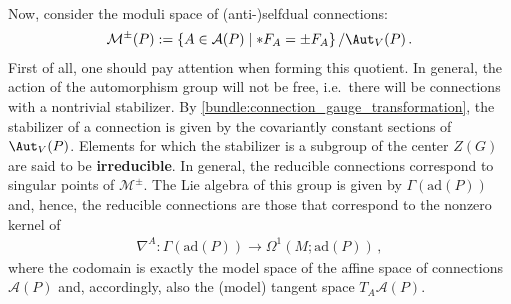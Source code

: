     Now, consider the moduli space of (anti-)selfdual connections:
    \begin{gather}
        \mathcal{M}^\pm(P) := \{A\in\mathcal{A}(P)\mid\ast F_A=\pm F_A\}\, / \Aut_V(P)\,.
    \end{gather}
    First of all, one should pay attention when forming this quotient. In general, the action of the automorphism group will not be free, i.e.~there will be connections with a nontrivial stabilizer. By \cref{bundle:connection_gauge_transformation}, the stabilizer of a connection is given by the covariantly constant sections of $\Aut_V(P)$. Elements for which the stabilizer is a subgroup of the center $Z(G)$ are said to be \textbf{irreducible}. In general, the reducible connections correspond to singular points of $\mathcal{M}^\pm$. The Lie algebra of this group is given by $\Gamma(\mathrm{ad}(P))$ and, hence, the reducible connections are those that correspond to the nonzero kernel of
    \begin{gather}
        \nabla^A:\Gamma(\mathrm{ad}(P))\rightarrow\Omega^1(M;\mathrm{ad}(P))\,,
    \end{gather}
    where the codomain is exactly the model space of the affine space of connections $\mathcal{A}(P)$ and, accordingly, also the (model) tangent space $T_A\mathcal{A}(P)$.

